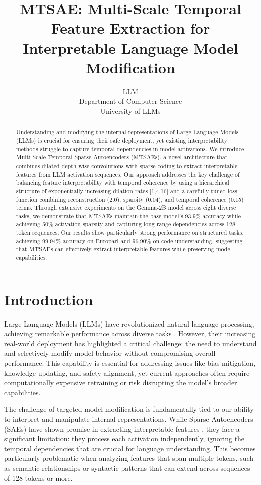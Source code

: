 \documentclass{article} %
\title{MTSAE: Multi-Scale Temporal Feature Extraction for Interpretable Language Model Modification}
\author{LLM\\
Department of Computer Science\\
University of LLMs\\
}
\begin{document}
\maketitle

\begin{abstract}
Understanding and modifying the internal representations of Large Language Models (LLMs) is crucial for ensuring their safe deployment, yet existing interpretability methods struggle to capture temporal dependencies in model activations. We introduce Multi-Scale Temporal Sparse Autoencoders (MTSAEs), a novel architecture that combines dilated depth-wise convolutions with sparse coding to extract interpretable features from LLM activation sequences. Our approach addresses the key challenge of balancing feature interpretability with temporal coherence by using a hierarchical structure of exponentially increasing dilation rates [1,4,16] and a carefully tuned loss function combining reconstruction (2.0), sparsity (0.04), and temporal coherence (0.15) terms. Through extensive experiments on the Gemma-2B model across eight diverse tasks, we demonstrate that MTSAEs maintain the base model's 93.9\% accuracy while achieving 50\% activation sparsity and capturing long-range dependencies across 128-token sequences. Our results show particularly strong performance on structured tasks, achieving 99.94\% accuracy on Europarl and 96.90\% on code understanding, suggesting that MTSAEs can effectively extract interpretable features while preserving model capabilities.
\end{abstract}

\section{Introduction}
\label{sec:intro}

Large Language Models (LLMs) have revolutionized natural language processing, achieving remarkable performance across diverse tasks \cite{gpt4}. However, their increasing real-world deployment has highlighted a critical challenge: the need to understand and selectively modify model behavior without compromising overall performance. This capability is essential for addressing issues like bias mitigation, knowledge updating, and safety alignment, yet current approaches often require computationally expensive retraining or risk disrupting the model's broader capabilities.

The challenge of targeted model modification is fundamentally tied to our ability to interpret and manipulate internal representations. While Sparse Autoencoders (SAEs) have shown promise in extracting interpretable features \cite{goodfellow2016deep}, they face a significant limitation: they process each activation independently, ignoring the temporal dependencies that are crucial for language understanding. This becomes particularly problematic when analyzing features that span multiple tokens, such as semantic relationships or syntactic patterns that can extend across sequences of 128 tokens or more.
\end{document}
